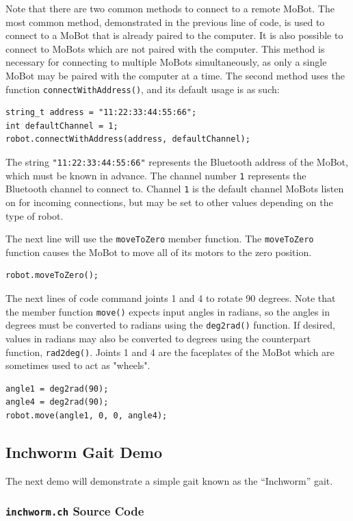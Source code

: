 \documentclass{article}
\begin{document}
Note that there are two common methods to connect to a remote MoBot. 
The most common method, demonstrated in the previous line of code, is
used to connect to a MoBot that is already paired to the computer. It
is also possible to connect to MoBots which are not paired with the 
computer. This method is necessary for connecting to multiple
MoBots simultaneously, as only a single MoBot may be paired with the
computer at a time. The second method uses the function
\texttt{connectWithAddress()}, and its default usage is as such:
\begin{verbatim}
string_t address = "11:22:33:44:55:66";
int defaultChannel = 1;
robot.connectWithAddress(address, defaultChannel);
\end{verbatim}
The string \texttt{"11:22:33:44:55:66"} represents the Bluetooth address
of the MoBot, which must be known in advance. The channel number \texttt{1} 
represents the Bluetooth channel to connect to. Channel \texttt{1}
is the default channel MoBots listen on for incoming connections, but
may be set to other values depending on the type of robot.

The next line will use the \texttt{moveToZero} member function. The
\texttt{moveToZero} function causes the MoBot to move all of its motors to the
zero position.
\begin{verbatim}
robot.moveToZero();
\end{verbatim}

The next lines of code command joints 1 and 4 to rotate 90 degrees.
Note that the member function \texttt{move()} expects input angles
in radians, so the angles in degrees must be converted to radians
using the \texttt{deg2rad()} function. If desired, values in radians
may also be converted to degrees using the counterpart function,
\texttt{rad2deg()}.
Joints 1 and 4 are the faceplates
of the MoBot which are sometimes used to act as "wheels".
\begin{verbatim}
angle1 = deg2rad(90);
angle4 = deg2rad(90);
robot.move(angle1, 0, 0, angle4);
\end{verbatim}

\subsection{Inchworm Gait Demo}
The next demo will demonstrate a simple gait known as the ``Inchworm'' gait.

\subsubsection{\texttt{inchworm.ch} Source Code}

\end{document}
